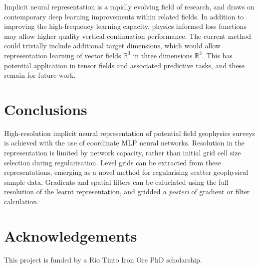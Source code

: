 \documentclass[manuscript.tex]{subfiles}
\begin{document}
Implicit neural representation is a rapidly evolving field of research, and draws on contemporary deep learning improvements within related fields.
In addition to improving the high-frequency learning capacity, physics informed loss functions may allow higher quality vertical continuation performance.
The current method could trivially include additional target dimensions, which would allow representation learning of vector fields \(\mathbb{R}^{3}\) in three dimensions \(\mathbb{R}^{3}\).
This has potential application in tensor fields and associated predictive tasks, and these remain for future work.

\section{Conclusions}
High-resolution implicit neural representation of potential field geophysics surveys is achieved with the use of coordinate MLP neural networks.
Resolution in the representation is limited by network capacity, rather than initial grid cell size selection during regularisation.
Level grids can be extracted from these representations, emerging as a novel method for regularising scatter geophysical sample data.
Gradients and spatial filters can be caluclated using the full resolution of the learnt representation, and gridded \emph{a posteri} of gradient or filter calculation.


\section{Acknowledgements}
This project is funded by a Rio Tinto Iron Ore PhD scholarship.

\printbibliography{}



\end{document}
